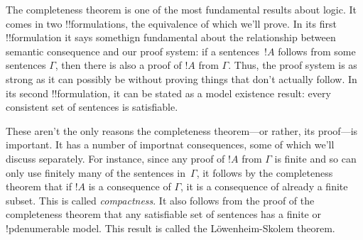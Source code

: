 \documentclass[../../include/open-logic-section]{subfiles}
\begin{document}

The completeness theorem is one of the most fundamental results about
logic.  It comes in two !!{formula}tions, the equivalence of which we'll
prove. In its first !!{formula}tion it says somethign fundamental about
the relationship between semantic consequence and our proof system: if
a sentences~$!A$ follows from some sentences $\Gamma$, then there is
also a proof of $!A$ from $\Gamma$.  Thus, the proof system is as
strong as it can possibly be without proving things that don't
actually follow.  In its second !!{formula}tion, it can be stated as a
model existence result: every consistent set of sentences is
satisfiable.

These aren't the only reasons the completeness theorem---or rather,
its proof---is important. It has a number of importnat consequences,
some of which we'll discuss separately.  For instance, since any proof
of $!A$ from $\Gamma$ is finite and so can only use finitely many of
the sentences in~$\Gamma$, it follows by the completeness theorem that
if $!A$ is a consequence of $\Gamma$, it is a consequence of already a
finite subset.  This is called \emph{compactness}.  It also follows
from the proof of the completeness theorem that any satisfiable set of
sentences has a finite or !p{denumerable} model. This result is called the
L\"owenheim-Skolem theorem.
\end{document}
